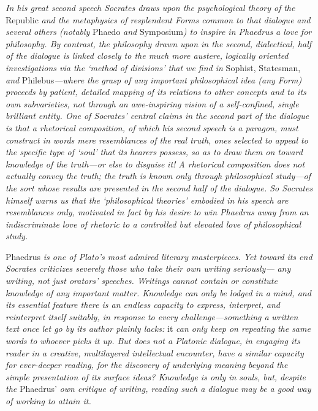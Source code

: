 {\em In his great second speech Socrates draws upon the psychological
theory of} {\em the} Republic {\em and the metaphysics of resplendent
Forms common to that dialogue} {\em and several others (notably} Phaedo
{\em and} Symposium{\em ) to inspire in Phaedrus} {\em a love for
philosophy. By contrast, the philosophy drawn upon in the second,}
{\em dialectical, half of the dialogue is linked closely to the much
more austere,} {\em logically oriented investigations via the ‘method of
divisions' that we find in} Sophist, Statesman, {\em and}
Philebus{\em ---where the grasp of any important philosophical}
{\em idea (any Form) proceeds by patient, detailed mapping of its
relations} {\em to other concepts and to its own subvarieties, not
through an awe-inspiring vision} {\em of a self-confined, single
brilliant entity. One of Socrates' central claims in} {\em the second
part of the dialogue is that a rhetorical composition, of which his
second} {\em speech is a paragon, must construct in words mere
resemblances of the} {\em real truth, ones selected to appeal to the
specific type of ‘soul' that its hearers} {\em possess, so as to draw
them on toward knowledge of the truth---or else to disguise} {\em it! A
rhetorical composition does not actually convey the truth; the truth}
{\em is known only through philosophical study---of the sort whose
results are presented} {\em in the second half of the dialogue. So
Socrates himself warns us that the} {\em ‘philosophical theories'
embodied in his speech are resemblances only, motivated} {\em in fact by
his desire to win Phaedrus away from an indiscriminate love of rhetoric}
{\em to a controlled but elevated love of philosophical study.}

Phaedrus {\em is one of Plato's most admired literary masterpieces. Yet
toward} {\em its end Socrates criticizes severely those who take their
own writing seriously---} {\em any writing, not just orators' speeches.
Writings cannot contain or constitute} {\em knowledge of any important
matter. Knowledge can only be lodged in a} {\em mind, and its essential
feature there is an endless capacity to express, interpret,} {\em and
reinterpret itself suitably, in response to every challenge---something
a} {\em written text once let go by its author plainly lacks:} it
{\em can only keep on repeating} {\em the same words to whoever picks it
up. But does not a Platonic dialogue,} {\em in engaging its reader in a
creative, multilayered intellectual encounter, have a} {\em similar
capacity for ever-deeper reading, for the discovery of underlying
meaning} {\em beyond the simple presentation of its surface ideas?
Knowledge is only in} {\em souls, but, despite the} Phaedrus' {\em own
critique of writing, reading such a dialogue} {\em may be a good way of
working to attain it.}


